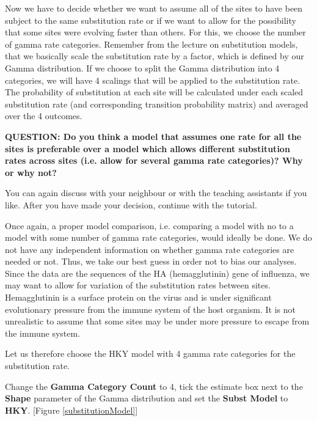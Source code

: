 \documentclass[11pt]{article}
\begin{document}
Now we have to decide whether we want to assume all of the sites to have been subject to the same substitution rate or if we want to allow for the possibility that some sites were evolving faster than others. For this, we choose the number of gamma rate categories. Remember from the lecture on substitution models, that we basically scale the substitution rate by a factor, which is defined by our Gamma distribution. If we choose to split the Gamma distribution into 4 categories, we will have 4 scalings that will be applied to the substitution rate. The probability of substitution at each site will be calculated under each scaled substitution rate (and corresponding transition probability matrix) and averaged over the 4 outcomes.
  
\begin{framed}
{\bf QUESTION: Do you think a model that assumes one rate for all the sites is preferable over a model which allows different substitution rates across sites (i.e. allow for several gamma rate categories)? Why or why not?} 

You can again discuss with your neighbour or with the teaching assistants if you like. After you have made your decision, continue with the tutorial.
\end{framed}

Once again, a proper model comparison, i.e. comparing a model with no to a model with some number of gamma rate categories, would ideally be done. We do not have any independent information on whether gamma rate categories are needed or not. Thus, we take our best guess in order not to bias our analyses. Since the data are the sequences of the HA (hemagglutinin) gene of influenza, we may want to allow for variation of the substitution rates between sites. Hemagglutinin is a surface protein on the virus and is under significant evolutionary pressure from the immune system of the host organism. It is not unrealistic to assume that some sites may be under more pressure to escape from the immune system.

Let us therefore choose the HKY model with 4 gamma rate categories for the substitution rate. 

\begin{framed}
Change the \textbf{Gamma Category Count} to 4, tick the estimate box next to the \textbf{Shape} parameter of the Gamma distribution and set the \textbf{Subst Model} to \textbf{HKY}. [Figure \ref{substitutionModel}] 
\end{framed}
\end{document}
